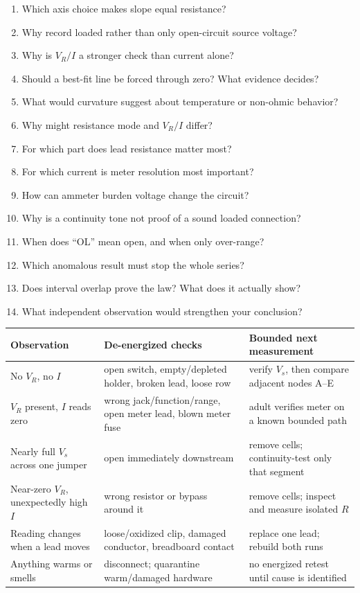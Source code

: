\begin{multicols}{2}
\begin{enumerate}
\item Which axis choice makes slope equal resistance?
\item Why record loaded rather than only open-circuit source voltage?
\item Why is \(V_R/I\) a stronger check than current alone?
\item Should a best-fit line be forced through zero? What evidence decides?
\item What would curvature suggest about temperature or non-ohmic behavior?
\item Why might resistance mode and \(V_R/I\) differ?
\item For which part does lead resistance matter most?
\item For which current is meter resolution most important?
\item How can ammeter burden voltage change the circuit?
\item Why is a continuity tone not proof of a sound loaded connection?
\item When does ``OL'' mean open, and when only over-range?
\item Which anomalous result must stop the whole series?
\item Does interval overlap prove the law? What does it actually show?
\item What independent observation would strengthen your conclusion?
\end{enumerate}
\end{multicols}

\small
\begin{tabularx}{\linewidth}{@{}>{\raggedright\arraybackslash}p{.23\linewidth} L L@{}}
\toprule
Observation & De-energized checks & Bounded next measurement\\
\midrule
No \(V_R\), no \(I\) &
open switch, empty/depleted holder, broken lead, loose row &
verify \(V_s\), then compare adjacent nodes A--E\\
\(V_R\) present, \(I\) reads zero &
wrong jack/function/range, open meter lead, blown meter fuse &
adult verifies meter on a known bounded path\\
Nearly full \(V_s\) across one jumper &
open immediately downstream &
remove cells; continuity-test only that segment\\
Near-zero \(V_R\), unexpectedly high \(I\) &
wrong resistor or bypass around it &
remove cells; inspect and measure isolated \(R\)\\
Reading changes when a lead moves &
loose/oxidized clip, damaged conductor, breadboard contact &
replace one lead; rebuild both runs\\
Anything warms or smells &
disconnect; quarantine warm/damaged hardware &
no energized retest until cause is identified\\
\bottomrule
\end{tabularx}
\normalsize

